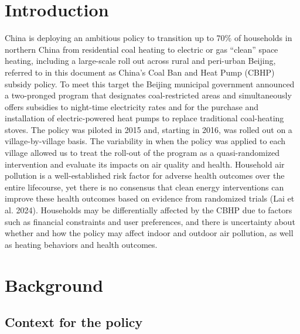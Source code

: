 \documentclass[
  letterpaper,
  DIV=11,
  numbers=noendperiod]{scrartcl}
\begin{document}
\newpage

\hypertarget{introduction-1}{%
\section{Introduction}\label{introduction-1}}

China is deploying an ambitious policy to transition up to 70\% of
households in northern China from residential coal heating to electric
or gas ``clean'' space heating, including a large-scale roll out across
rural and peri-urban Beijing, referred to in this document as China's
Coal Ban and Heat Pump (CBHP) subsidy policy. To meet this target the
Beijing municipal government announced a two-pronged program that
designates coal-restricted areas and simultaneously offers subsidies to
night-time electricity rates and for the purchase and installation of
electric-powered heat pumps to replace traditional coal-heating stoves.
The policy was piloted in 2015 and, starting in 2016, was rolled out on
a village-by-village basis. The variability in when the policy was
applied to each village allowed us to treat the roll-out of the program
as a quasi-randomized intervention and evaluate its impacts on air
quality and health. Household air pollution is a well-established risk
factor for adverse health outcomes over the entire lifecourse, yet there
is no consensus that clean energy interventions can improve these health
outcomes based on evidence from randomized trials (Lai et al. 2024).
Households may be differentially affected by the CBHP due to factors
such as financial constraints and user preferences, and there is
uncertainty about whether and how the policy may affect indoor and
outdoor air pollution, as well as heating behaviors and health outcomes.

\hypertarget{background}{%
\section{Background}\label{background}}

\hypertarget{context-for-the-policy}{%
\subsection{Context for the policy}\label{context-for-the-policy}}
\end{document}
